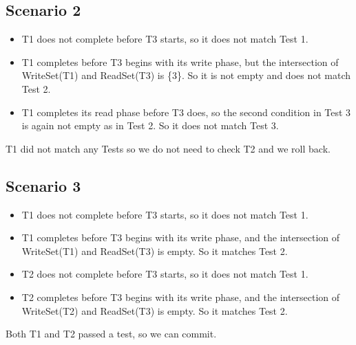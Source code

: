 \documentclass[12pt,a4paper]{article}
\begin{document}
\subsection{Scenario 2}
\begin{itemize}
\item T1 does not complete before T3 starts, so it does not match Test 1.
\item T1 completes before T3 begins with its write phase, but the intersection of WriteSet(T1) and ReadSet(T3) is \{3\}. So it is not empty and does not match Test 2.
\item T1 completes its read phase before T3 does, so the second condition in Test 3 is again not empty as in Test 2. So it does not match Test 3.
\end{itemize}
T1 did not match any Tests so we do not need to check T2 and we roll back.
\subsection{Scenario 3}
\begin{itemize}
\item T1 does not complete before T3 starts, so it does not match Test 1.
\item T1 completes before T3 begins with its write phase, and the intersection of WriteSet(T1) and ReadSet(T3) is empty. So it matches Test 2.
\item T2 does not complete before T3 starts, so it does not match Test 1.
\item T2 completes before T3 begins with its write phase, and the intersection of WriteSet(T2) and ReadSet(T3) is empty. So it matches Test 2.
\end{itemize}
Both T1 and T2 passed a test, so we can commit.
\end{document}
